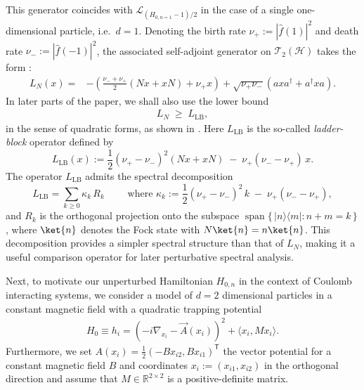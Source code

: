 \documentclass[11pt]{amsart}
\newcommand{\1}{\mathbbm{1}}
\newcommand{\cH}{\mathcal{H}}
\newcommand{\cL}{\mathcal{L}}
\theoremstyle{plain}
\theoremstyle{definition}
\theoremstyle{remark}
\numberwithin{equation}{section}
\begin{document}
\noindent This generator coincides with $\cL_{(H_{0,n=1}-1)/2}$ in the case of a single one-dimensional particle, i.e.~$d=1$. Denoting the birth rate $\nu_+:=|\widehat{f}(1)|^2$ and death rate $\nu_-:=|\widehat{f}(-1)|^2$, the associated self-adjoint generator on $\mathscr{T}_2(\cH)$ takes the form \cite{OU}:
\begin{align}
\label{eq:HSgenerator}
L_{N}(x)
=&
-\left( \frac{\nu_- + \nu_+}{2}(Nx + xN) + \nu_+ x \right)
+ \sqrt{\nu_+ \nu_-}( a x a^{\dagger} +  a^{\dagger} x a).
\end{align}
In later parts of the paper, we shall also use the lower bound
\begin{align}\label{ladderblockboundqOU}
L_{N} \;\ge\; L_{\operatorname{LB}},
\end{align}
in the sense of quadratic forms, as shown in \cite[Proof of Thm.~6.3]{OU}. Here $L_{\operatorname{LB}}$ is the so-called \textit{ladder-block} operator defined by
\begin{equation}
\label{eq:ladderblock}
L_{\operatorname{LB}}(x)
:= \frac{1}{2}(\nu_+ - \nu_-)^2 (N x + x N) \;-\; \nu_+(\nu_- - \nu_+)\, x.
\end{equation}
The operator $L_{\operatorname{LB}}$ admits the spectral decomposition
\begin{equation}
\label{eq:LBdecomp}
L_{\operatorname{LB}} = \sum_{k \ge 0} \kappa_k\, R_k\qquad \text{ where }
\kappa_k := \frac{1}{2}(\nu_+ - \nu_-)^2\, k \;-\; \nu_+(\nu_- - \nu_+),
\end{equation}
and $R_k$ is the orthogonal projection onto the subspace $\operatorname{span}\{\, |n\rangle\langle m| : n+m = k \,\}$, where $\ket{n}$ denotes the Fock state with $N\ket{n}=n\ket{n}$. This decomposition provides a simpler spectral structure than that of $L_{N}$, making it a useful comparison operator for later perturbative spectral analysis.





\medskip 

\noindent Next, to motivate our unperturbed Hamiltonian $H_{0,n}$ in the context of Coulomb interacting systems, we consider a model of $d=2$ dimensional particles in a constant magnetic field with a quadratic trapping potential
\begin{align}\label{H0unperturedH}
   H_0\equiv  h_i = (-i\nabla_{x_i} - \vec{A}(x_i))^2 + \langle x_i,Mx_i\rangle.
\end{align}
Furthermore, we set \( {A}(x_i) = \frac{1}{2}(-Bx_{i2},Bx_{i1})^{\mathsf T} \)  the vector potential for a constant magnetic field \(B\) and coordinates $x_i:=(x_{i1},x_{i2})$ in the orthogonal direction and assume that \( M \in \mathbb R^{2\times 2} \) is a positive-definite matrix. 
\end{document}
